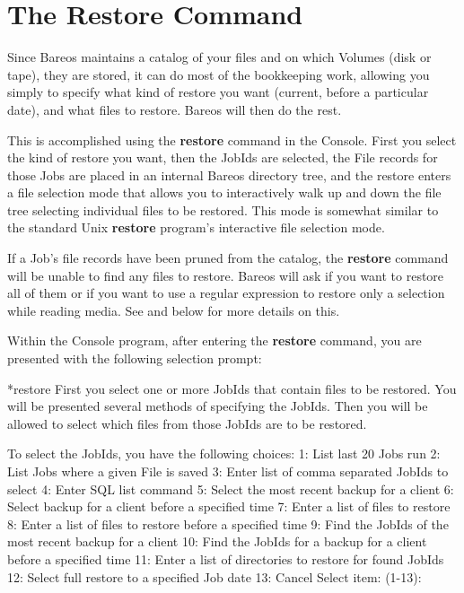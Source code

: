 \section{The Restore Command}
\label{Example1}

Since Bareos maintains a catalog of your files and on which Volumes (disk or
tape), they are stored, it can do most of the bookkeeping work, allowing you
simply to specify what kind of restore you want (current, before a particular
date), and what files to restore. Bareos will then do the rest.

This is accomplished using the {\bf restore} command in the Console. First you
select the kind of restore you want, then the JobIds are selected,
the File records for those Jobs are placed in an internal Bareos directory
tree, and the restore enters a file selection mode that allows you to
interactively walk up and down the file tree selecting individual files to be
restored. This mode is somewhat similar to the standard Unix {\bf restore}
program's interactive file selection mode.

If a Job's file records have been pruned from the catalog, the {\bf restore}
command will be unable to find any files to restore. Bareos will ask if you
want to restore all of them or if you want to use a regular expression to
restore only a selection while reading media.
See  and below for more details on this.

Within the Console program, after entering the {\bf restore} command, you are
presented with the following selection prompt:

\begin{bconsole}{*}{restore}{}{}
First you select one or more JobIds that contain files
to be restored. You will be presented several methods
of specifying the JobIds. Then you will be allowed to
select which files from those JobIds are to be restored.

To select the JobIds, you have the following choices:
     1: List last 20 Jobs run
     2: List Jobs where a given File is saved
     3: Enter list of comma separated JobIds to select
     4: Enter SQL list command
     5: Select the most recent backup for a client
     6: Select backup for a client before a specified time
     7: Enter a list of files to restore
     8: Enter a list of files to restore before a specified time
     9: Find the JobIds of the most recent backup for a client
    10: Find the JobIds for a backup for a client before a specified time
    11: Enter a list of directories to restore for found JobIds
    12: Select full restore to a specified Job date
    13: Cancel
Select item:  (1-13):
\end{bconsole}

